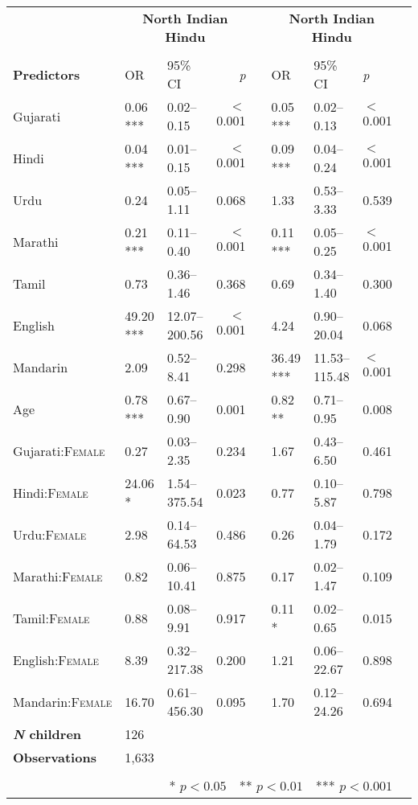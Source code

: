 \begin{table}[ht]
\begin{threeparttable}
\begin{tabular}{lllrllllr}
& \multicolumn{3}{c}{\textbf{North Indian Hindu}\tnote{a}} & & \multicolumn{3}{c}{\textbf{North Indian Hindu}\tnote{a}} \\
\cline{2-4} \cline{6-8} \\[-.75em]
\textbf{Predictors} & OR & 95\% CI & \textit{p} & & OR & 95\% CI & \textit{p} \\ 
\midrule
  Gujarati & 0.06 *** & 0.02--0.15 & $<$0.001 &  & 0.05 *** & 0.02--0.13 & $<$0.001 \\ 
  Hindi & 0.04 *** & 0.01--0.15 & $<$0.001 &  & 0.09 *** & 0.04--0.24 & $<$0.001 \\ 
  Urdu & 0.24 & 0.05--1.11 & 0.068 &  & 1.33 & 0.53--3.33 & 0.539 \\ 
  Marathi & 0.21 *** & 0.11--0.40 & $<$0.001 &  & 0.11 *** & 0.05--0.25 & $<$0.001 \\ 
  Tamil & 0.73 & 0.36--1.46 & 0.368 &  & 0.69 & 0.34--1.40 & 0.300 \\ 
  English & 49.20 *** & 12.07--200.56 & $<$0.001 &  & 4.24 & 0.90--20.04 & 0.068 \\ 
  Mandarin & 2.09 & 0.52--8.41 & 0.298 &  & 36.49 *** & 11.53--115.48 & $<$0.001 \\  
  Age\tnote{b} & 0.78 *** & 0.67--0.90 & 0.001 &  & 0.82 ** & 0.71--0.95 & 0.008 \\ 
  Gujarati:\textsc{Female} & 0.27 & 0.03--2.35 & 0.234 &  & 1.67 & 0.43--6.50 & 0.461 \\
  Hindi:\textsc{Female}   & 24.06 * & 1.54--375.54 & 0.023 &  & 0.77 & 0.10--5.87 & 0.798 \\ 
  Urdu:\textsc{Female}   & 2.98 & 0.14--64.53 & 0.486 &  & 0.26 & 0.04--1.79 & 0.172 \\ 
  Marathi:\textsc{Female}   & 0.82 & 0.06--10.41 & 0.875 &  & 0.17 & 0.02--1.47 & 0.109 \\ 
  Tamil:\textsc{Female}   & 0.88 & 0.08--9.91 & 0.917 &  & 0.11 * & 0.02--0.65 & 0.015 \\ 
  English:\textsc{Female}   & 8.39 & 0.32--217.38 & 0.200 &  & 1.21 & 0.06--22.67 & 0.898 \\ 
  Mandarin:\textsc{Female}   & 16.70 & 0.61--456.30 & 0.095 &  & 1.70 & 0.12--24.26 & 0.694 \\ 
\midrule
\bfseries{\textit{N} children}\tnote{c} & 126   &  &  &  &  &  &  \\
\textbf{Observations}\tnote{d} & 1,633  &  &  &  &  &  &  \\
\bottomrule\\[-.75em]
\multicolumn{8}{r}{* $p<0.05$~~** $p<0.01$~~*** $p<0.001$}\\

\end{tabular}
\end{threeparttable}
\end{table}
